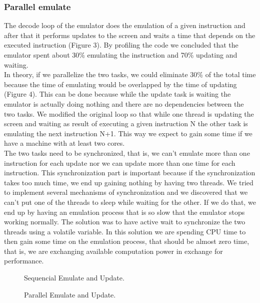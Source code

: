 \subsubsection{Parallel emulate}
The decode loop of the emulator does the emulation of a given instruction and after that it performs updates to the screen and waits a time that depends on the executed instruction (Figure 3). By profiling the code we concluded that the emulator spent about 30\% emulating the instruction and 70\% updating and waiting.\\
\indent In theory, if we parallelize the two tasks, we could eliminate 30\% of the total time because the time of emulating would be overlapped by the time of updating (Figure 4). This can be done because while the update task is waiting the emulator is actually doing nothing and there are no dependencies between the two tasks.
We modified the original loop so that while one thread is updating the screen and waiting as result of executing a given instruction N the other task is emulating the next instruction N+1. This way we expect to gain some time if we have a machine with at least two cores.\\
\indent The two tasks need to be synchronized, that is, we can't emulate more than one instruction for each update nor we can update more than one time for each instruction. This synchronization part is important because if the synchronization takes too much time, we end up gaining nothing by having two threads. We tried to implement several mechanisms of synchronization and we discovered that we can't put one of the threads to sleep while waiting for the other. If we do that, we end up by having an emulation process that is so slow that the emulator stops working normally. The solution was to have active wait to synchronize the two threads using a volatile variable. In this solution we are spending CPU time to then gain some time on the emulation process, that should be almost zero time, that is, we are exchanging available computation power in exchange for performance.

\begin{figure}[h]
	\caption{Sequencial Emulate and Update.}
\end{figure}
\begin{figure}[h]
	\caption{Parallel Emulate and Update.}
\end{figure}


